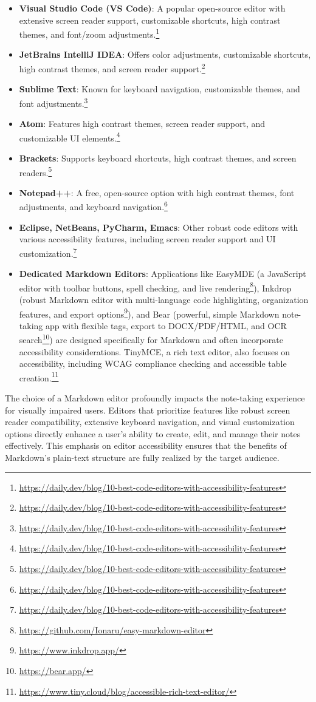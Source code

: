 \begin{itemize}[noitemsep,topsep=0pt]
    \item \textbf{Visual Studio Code (VS Code)}: A popular open-source editor with extensive screen reader support, customizable shortcuts, high contrast themes, and font/zoom adjustments.\footnote{\url{https://daily.dev/blog/10-best-code-editors-with-accessibility-features}}
    \item \textbf{JetBrains IntelliJ IDEA}: Offers color adjustments, customizable shortcuts, high contrast themes, and screen reader support.\footnote{\url{https://daily.dev/blog/10-best-code-editors-with-accessibility-features}}
    \item \textbf{Sublime Text}: Known for keyboard navigation, customizable themes, and font adjustments.\footnote{\url{https://daily.dev/blog/10-best-code-editors-with-accessibility-features}}
    \item \textbf{Atom}: Features high contrast themes, screen reader support, and customizable UI elements.\footnote{\url{https://daily.dev/blog/10-best-code-editors-with-accessibility-features}}
    \item \textbf{Brackets}: Supports keyboard shortcuts, high contrast themes, and screen readers.\footnote{\url{https://daily.dev/blog/10-best-code-editors-with-accessibility-features}}
    \item \textbf{Notepad++}: A free, open-source option with high contrast themes, font adjustments, and keyboard navigation.\footnote{\url{https://daily.dev/blog/10-best-code-editors-with-accessibility-features}}
    \item \textbf{Eclipse, NetBeans, PyCharm, Emacs}: Other robust code editors with various accessibility features, including screen reader support and UI customization.\footnote{\url{https://daily.dev/blog/10-best-code-editors-with-accessibility-features}}
    \item \textbf{Dedicated Markdown Editors}: Applications like EasyMDE (a JavaScript editor with toolbar buttons, spell checking, and live rendering\footnote{\url{https://github.com/Ionaru/easy-markdown-editor}}), Inkdrop (robust Markdown editor with multi-language code highlighting, organization features, and export options\footnote{\url{https://www.inkdrop.app/}}), and Bear (powerful, simple Markdown note-taking app with flexible tags, export to DOCX/PDF/HTML, and OCR search\footnote{\url{https://bear.app/}}) are designed specifically for Markdown and often incorporate accessibility considerations. TinyMCE, a rich text editor, also focuses on accessibility, including WCAG compliance checking and accessible table creation.\footnote{\url{https://www.tiny.cloud/blog/accessible-rich-text-editor/}}
\end{itemize}
The choice of a Markdown editor profoundly impacts the note-taking experience for visually impaired users. Editors that prioritize features like robust screen reader compatibility, extensive keyboard navigation, and visual customization options directly enhance a user's ability to create, edit, and manage their notes effectively. This emphasis on editor accessibility ensures that the benefits of Markdown's plain-text structure are fully realized by the target audience.


